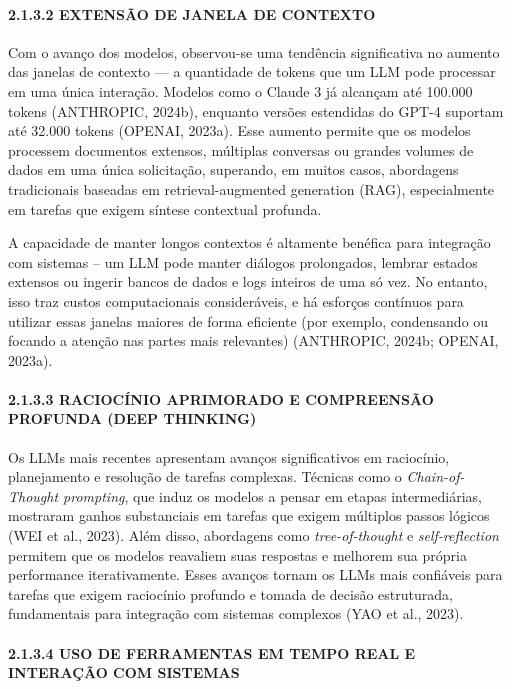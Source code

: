 \documentclass[
]{article}
\begin{document}
\paragraph{2.1.3.2 EXTENSÃO DE JANELA DE
CONTEXTO}\label{extensuxe3o-de-janela-de-contexto}

Com o avanço dos modelos, observou-se uma tendência significativa no
aumento das janelas de contexto --- a quantidade de tokens que um LLM
pode processar em uma única interação. Modelos como o Claude 3 já
alcançam até 100.000 tokens (ANTHROPIC, 2024b), enquanto versões
estendidas do GPT-4 suportam até 32.000 tokens (OPENAI, 2023a). Esse
aumento permite que os modelos processem documentos extensos, múltiplas
conversas ou grandes volumes de dados em uma única solicitação,
superando, em muitos casos, abordagens tradicionais baseadas em
retrieval-augmented generation (RAG), especialmente em tarefas que
exigem síntese contextual profunda.

A capacidade de manter longos contextos é altamente benéfica para
integração com sistemas -- um LLM pode manter diálogos prolongados,
lembrar estados extensos ou ingerir bancos de dados e logs inteiros de
uma só vez. No entanto, isso traz custos computacionais consideráveis, e
há esforços contínuos para utilizar essas janelas maiores de forma
eficiente (por exemplo, condensando ou focando a atenção nas partes mais
relevantes) (ANTHROPIC, 2024b; OPENAI, 2023a).

\paragraph{2.1.3.3 RACIOCÍNIO APRIMORADO E COMPREENSÃO PROFUNDA (DEEP
THINKING)}\label{raciocuxednio-aprimorado-e-compreensuxe3o-profunda-deep-thinking}

Os LLMs mais recentes apresentam avanços significativos em raciocínio,
planejamento e resolução de tarefas complexas. Técnicas como o
\emph{Chain-of-Thought prompting}, que induz os modelos a pensar em
etapas intermediárias, mostraram ganhos substanciais em tarefas que
exigem múltiplos passos lógicos (WEI et al., 2023). Além disso,
abordagens como \emph{tree-of-thought} e \emph{self-reflection} permitem
que os modelos reavaliem suas respostas e melhorem sua própria
performance iterativamente. Esses avanços tornam os LLMs mais confiáveis
para tarefas que exigem raciocínio profundo e tomada de decisão
estruturada, fundamentais para integração com sistemas complexos (YAO et
al., 2023).

\paragraph{2.1.3.4 USO DE FERRAMENTAS EM TEMPO REAL E INTERAÇÃO COM
SISTEMAS}\label{uso-de-ferramentas-em-tempo-real-e-interauxe7uxe3o-com-sistemas}
\end{document}
